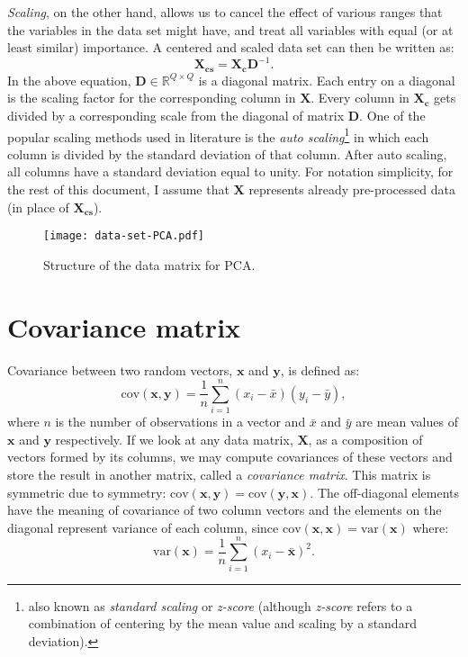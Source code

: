 \documentclass[10pt,twocolumn]{article}
\begin{document}
\textit{Scaling}, on the other hand, allows us to cancel the effect of various ranges that the variables in the data set might have, and treat all variables with equal (or at least similar) importance. A centered and scaled data set can then be written as:
\begin{equation}
\mathbf{X_{cs}} = \mathbf{X_c}\mathbf{D}^{-1}.
\end{equation}
In the above equation, $\mathbf{D} \in \mathbb{R}^{Q \times Q}$ is a diagonal matrix. Each entry on a diagonal is the scaling factor for the corresponding column in $\mathbf{X}$. Every column in $\mathbf{X_c}$ gets divided by a corresponding scale from the diagonal of matrix $\mathbf{D}$. One of the popular scaling methods used in literature is the \textit{auto scaling}\footnote{also known as \textit{standard scaling} or \textit{z-score} (although \textit{z-score} refers to a combination of centering by the mean value and scaling by a standard deviation).} in which each column is divided by the standard deviation of that column. After auto scaling, all columns have a standard deviation equal to unity. For notation simplicity, for the rest of this document, I assume that $\mathbf{X}$ represents already pre-processed data (in place of $\mathbf{X_{cs}}$).

\begin{figure}[t]
\centering\texttt{[image: data-set-PCA.pdf]}
\caption{Structure of the data matrix for PCA.}
\label{fig:data-matrix}
\end{figure}

\section{Covariance matrix}

Covariance between two random vectors, $\mathbf{x}$ and $\mathbf{y}$, is defined as:
\begin{equation}\label{eq:covariance-definition}
\text{cov}(\mathbf{x},\mathbf{y}) = \frac{1}{n} \sum_{i=1}^{n} (x_i - \bar{x}) (y_i - \bar{y}),
\end{equation}
where $n$ is the number of observations in a vector and $\bar{x}$ and $\bar{y}$ are mean values of $\mathbf{x}$ and $\mathbf{y}$ respectively. If we look at any data matrix, $\mathbf{X}$, as a composition of vectors formed by its columns, we may compute covariances of these vectors and store the result in another matrix, called a \textit{covariance matrix}. This matrix is symmetric due to symmetry: $\text{cov}(\mathbf{x},\mathbf{y}) = \text{cov}(\mathbf{y},\mathbf{x})$. The off-diagonal elements have the meaning of covariance of two column vectors and the elements on the diagonal represent variance of each column, since $\text{cov}(\mathbf{x},\mathbf{x}) = \text{var}(\mathbf{x})$ where:
\begin{equation}\label{eq:variance-definition}
\text{var}(\mathbf{x}) = \frac{1}{n} \sum_{i=1}^{n} (x_i - \bar{\mathbf{x}})^2.
\end{equation}
\end{document}

